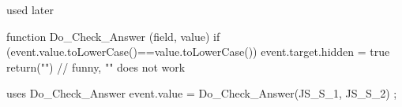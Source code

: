 
 used later 

  function Do_Check_Answer (field, value) 
   { if (event.value.toLowerCase()==value.toLowerCase())
       { event.target.hidden = true }
     return("") } // funny, "" does not work

\stopJSpreamble

 uses {Do_Check_Answer}
  event.value = Do_Check_Answer(JS_S_1, JS_S_2) ; 
\stopJScode

\endinput
